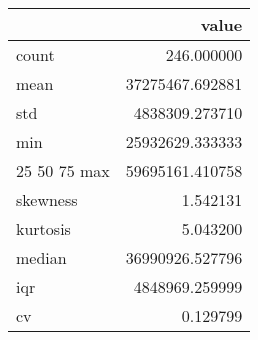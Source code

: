 \begin{tabular}{lr}
\toprule
 & value \\
\midrule
count & 246.000000 \\
mean & 37275467.692881 \\
std & 4838309.273710 \\
min & 25932629.333333 \\
25%
50%
75%
max & 59695161.410758 \\
skewness & 1.542131 \\
kurtosis & 5.043200 \\
median & 36990926.527796 \\
iqr & 4848969.259999 \\
cv & 0.129799 \\
\bottomrule
\end{tabular}
